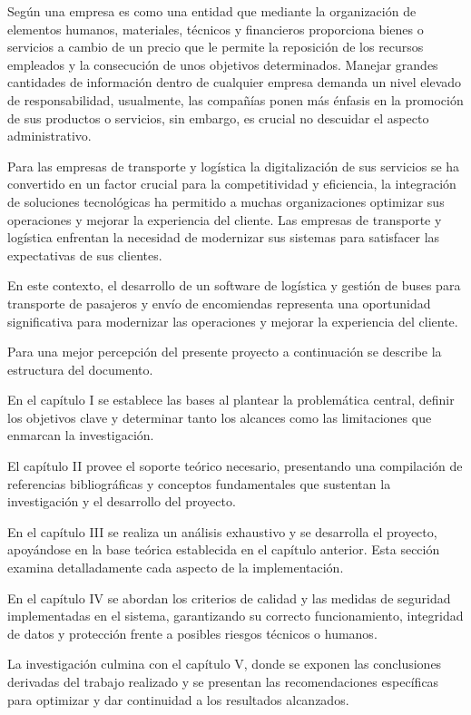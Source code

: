 	Según \textcite{casanueva2000practicas} una empresa es como una entidad que mediante la organización de elementos humanos, materiales, técnicos y financieros proporciona bienes o servicios a cambio de un precio que le permite la reposición de los recursos empleados y la consecución de unos objetivos determinados. Manejar grandes cantidades de información dentro de cualquier empresa demanda un nivel elevado de responsabilidad, usualmente, las compañías ponen más énfasis en la promoción de sus productos o servicios, sin embargo, es crucial no descuidar el aspecto administrativo.
	
	Para las empresas de transporte y logística la digitalización de sus servicios se ha convertido en un factor crucial para la competitividad y eficiencia, la integración de soluciones tecnológicas ha permitido a muchas organizaciones optimizar sus operaciones y mejorar la experiencia del cliente. Las empresas de transporte y logística enfrentan la necesidad de modernizar sus sistemas para satisfacer las expectativas de sus clientes. 
	
	En este contexto, el desarrollo de un software de logística y gestión de buses para transporte de pasajeros y envío de encomiendas representa una oportunidad significativa para modernizar las operaciones y mejorar la experiencia del cliente.
	
	Para una mejor percepción del presente proyecto a continuación se describe la estructura del documento.
	
	En el capítulo I se  establece las bases al plantear la problemática central, definir los objetivos clave y determinar tanto los alcances como las limitaciones que enmarcan la investigación.
	
	El capítulo II provee el soporte teórico necesario, presentando una compilación de referencias bibliográficas y conceptos fundamentales que sustentan la investigación y el desarrollo del proyecto.
	
	En el capítulo III se realiza un análisis exhaustivo y se desarrolla el proyecto, apoyándose en la base teórica establecida en el capítulo anterior. Esta sección examina detalladamente cada aspecto de la implementación.
	
	En el capítulo IV se abordan los criterios de calidad y las medidas de seguridad implementadas en el sistema, garantizando su correcto funcionamiento, integridad de datos y protección frente a posibles riesgos técnicos o humanos.
	
	La investigación culmina con el capítulo V, donde se exponen las conclusiones derivadas del trabajo realizado y se presentan las recomendaciones específicas para optimizar y dar continuidad a los resultados alcanzados.
	
